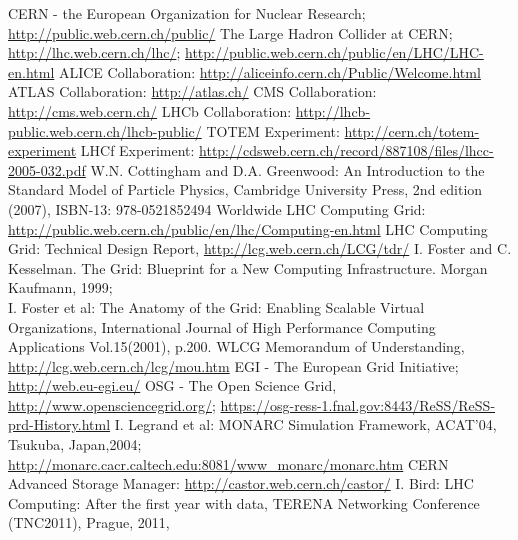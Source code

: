 \begin{thebibliography}{100}
%
 CERN - the European Organization for Nuclear Research;
\newline\url{http://public.web.cern.ch/public/}
%
  The Large Hadron Collider at
CERN; \url{http://lhc.web.cern.ch/lhc/};
\newline\url{http://public.web.cern.ch/public/en/LHC/LHC-en.html}
%
 ALICE
Collaboration: \url{http://aliceinfo.cern.ch/Public/Welcome.html}
%
 ATLAS Collaboration: \url{http://atlas.ch/}
%
  CMS Collaboration: \url{http://cms.web.cern.ch/}
%
 LHCb Collaboration: \url{http://lhcb-public.web.cern.ch/lhcb-public/}
%
 TOTEM Experiment: \url{http://cern.ch/totem-experiment}
%
 LHCf Experiment: \url{http://cdsweb.cern.ch/record/887108/files/lhcc-2005-032.pdf}
%
 W.N. Cottingham and D.A. Greenwood: An Introduction to the Standard Model of
Particle Physics, Cambridge University Press, 2nd edition (2007), ISBN-13: 978-0521852494
%
 Worldwide LHC Computing Grid:
\newline\url{http://public.web.cern.ch/public/en/lhc/Computing-en.html}
%
%
 LHC Computing Grid: Technical Design Report,
\newline\url{http://lcg.web.cern.ch/LCG/tdr/}
%
 I. Foster and C. Kesselman. The Grid: Blueprint for a New Computing Infrastructure.
Morgan Kaufmann, 1999;\\
     I. Foster et al: The Anatomy of the Grid: Enabling Scalable Virtual Organizations,
     International Journal of High Performance
     Computing Applications Vol.15(2001), p.200.
%
 WLCG Memorandum of Understanding,
\newline\url{http://lcg.web.cern.ch/lcg/mou.htm}
%
 EGI - The European Grid Initiative; \url{http://web.eu-egi.eu/}
%
 OSG - The Open Science Grid,
\newline\url{http://www.opensciencegrid.org/};
\newline\url{https://osg-ress-1.fnal.gov:8443/ReSS/ReSS-prd-History.html}
%
%
 I. Legrand et al: MONARC Simulation Framework, ACAT'04, Tsukuba, Japan,2004;
\newline\url{http://monarc.cacr.caltech.edu:8081/www_monarc/monarc.htm}
%
 CERN Advanced Storage Manager:
\newline\url{http://castor.web.cern.ch/castor/}
%
 I. Bird: LHC Computing: After the first year with data, TERENA
Networking Conference (TNC2011), Prague, 2011,

\end{thebibliography}
